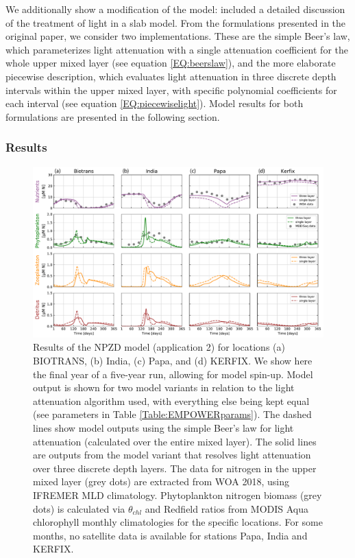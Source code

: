\documentclass[gmd, manuscript]{copernicus}
\begin{document}
We additionally show a modification of the model: \citet{Anderson2015c} included a detailed discussion of the treatment of light in a slab model. From the formulations presented in the original paper, we consider two implementations. These are the simple Beer's law, which parameterizes light attenuation with a single attenuation coefficient for the whole upper mixed layer (see equation \ref{EQ:beerslaw}), and the more elaborate piecewise description, which evaluates light attenuation in three discrete depth intervals within the upper mixed layer, with specific polynomial coefficients for each interval (see equation \ref{EQ:piecewiselight}). Model results for both formulations are presented in the following section.

\subsubsection{Results }
\begin{figure}[t]
\includegraphics[width=15cm]{Figures/firstdraft_plots/02_EMPOWER_lightcomp.pdf}
\caption{Results of the NPZD model (application 2) for locations (a) BIOTRANS, (b) India, (c) Papa, and (d) KERFIX. We show here the final year of a five-year run, allowing for model spin-up. Model output is shown for two model variants in relation to the light attenuation algorithm used, with everything else being kept equal (see parameters in Table \ref{Table:EMPOWERparams}). The dashed lines show model outputs using the simple Beer's law for light attenuation (calculated over the entire mixed layer). The solid lines are outputs from the model variant that resolves light attenuation over three discrete depth layers. The data for nitrogen in the upper mixed layer (grey dots) are extracted from WOA 2018, using IFREMER MLD climatology. Phytoplankton nitrogen biomass (grey dots) is calculated via $\theta_{chl}$ and Redfield ratios from MODIS Aqua chlorophyll monthly climatologies for the specific locations. For some months,  no satellite data is available for stations Papa, India and KERFIX.}
\label{Figure:ResultsEMPOWER}
\end{figure}
\end{document}
